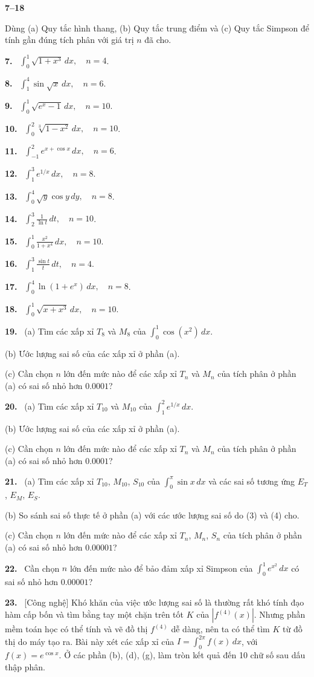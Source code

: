 \documentclass[12pt,a4paper]{article}
\newcommand{\bt}[1]{\par\smallskip\Needspace{5\baselineskip}\noindent\textbf{#1.}\ }
\newcommand{\group}[1]{\par\Needspace{11\baselineskip}\medskip\noindent\textbf{#1}\par\nopagebreak[4]}
\begin{document}
\group{7–18}
Dùng (a) Quy tắc hình thang, (b) Quy tắc trung điểm và (c) Quy tắc Simpson để tính gần đúng tích phân với giá trị $n$ đã cho.
\bt{7} $\displaystyle\int_0^1\sqrt{1+x^3}\,dx,\quad n=4$.
\bt{8} $\displaystyle\int_1^4\sin\sqrt{x}\,dx,\quad n=6$.
\bt{9} $\displaystyle\int_0^1\sqrt{e^x-1}\,dx,\quad n=10$.
\bt{10} $\displaystyle\int_0^2\sqrt[3]{1-x^2}\,dx,\quad n=10$.
\bt{11} $\displaystyle\int_{-1}^2 e^{x+\cos x}\,dx,\quad n=6$.
\bt{12} $\displaystyle\int_1^3 e^{1/x}\,dx,\quad n=8$.
\bt{13} $\displaystyle\int_0^4\sqrt y\cos y\,dy,\quad n=8$.
\bt{14} $\displaystyle\int_2^3\frac1{\ln t}\,dt,\quad n=10$.
\bt{15} $\displaystyle\int_0^1\frac{x^2}{1+x^4}\,dx,\quad n=10$.
\bt{16} $\displaystyle\int_1^3\frac{\sin t}{t}\,dt,\quad n=4$.
\bt{17} $\displaystyle\int_0^4\ln(1+e^x)\,dx,\quad n=8$.
\bt{18} $\displaystyle\int_0^1\sqrt{x+x^3}\,dx,\quad n=10$.

\bt{19} (a) Tìm các xấp xỉ $T_8$ và $M_8$ của $\int_0^1\cos(x^2)\,dx$.

(b) Ước lượng sai số của các xấp xỉ ở phần (a).

(c) Cần chọn $n$ lớn đến mức nào để các xấp xỉ $T_n$ và $M_n$ của tích phân ở phần (a) có sai số nhỏ hơn $0.0001$?

\bt{20} (a) Tìm các xấp xỉ $T_{10}$ và $M_{10}$ của $\int_1^2 e^{1/x}\,dx$.

(b) Ước lượng sai số của các xấp xỉ ở phần (a).

(c) Cần chọn $n$ lớn đến mức nào để các xấp xỉ $T_n$ và $M_n$ của tích phân ở phần (a) có sai số nhỏ hơn $0.0001$?

\bt{21} (a) Tìm các xấp xỉ $T_{10}$, $M_{10}$, $S_{10}$ của $\int_0^\pi\sin x\,dx$ và các sai số tương ứng $E_T$, $E_M$, $E_S$.

(b) So sánh sai số thực tế ở phần (a) với các ước lượng sai số do (3) và (4) cho.

(c) Cần chọn $n$ lớn đến mức nào để các xấp xỉ $T_n$, $M_n$, $S_n$ của tích phân ở phần (a) có sai số nhỏ hơn $0.00001$?

\bt{22} Cần chọn $n$ lớn đến mức nào để bảo đảm xấp xỉ Simpson của $\int_0^1e^{x^2}\,dx$ có sai số nhỏ hơn $0.00001$?

\bt{23} [Công nghệ] Khó khăn của việc ước lượng sai số là thường rất khó tính đạo hàm cấp bốn và tìm bằng tay một chặn trên tốt $K$ của $|f^{(4)}(x)|$. Nhưng phần mềm toán học có thể tính và vẽ đồ thị $f^{(4)}$ dễ dàng, nên ta có thể tìm $K$ từ đồ thị do máy tạo ra. Bài này xét các xấp xỉ của $I=\int_0^{2\pi}f(x)\,dx$, với $f(x)=e^{\cos x}$. Ở các phần (b), (d), (g), làm tròn kết quả đến 10 chữ số sau dấu thập phân.
\end{document}
